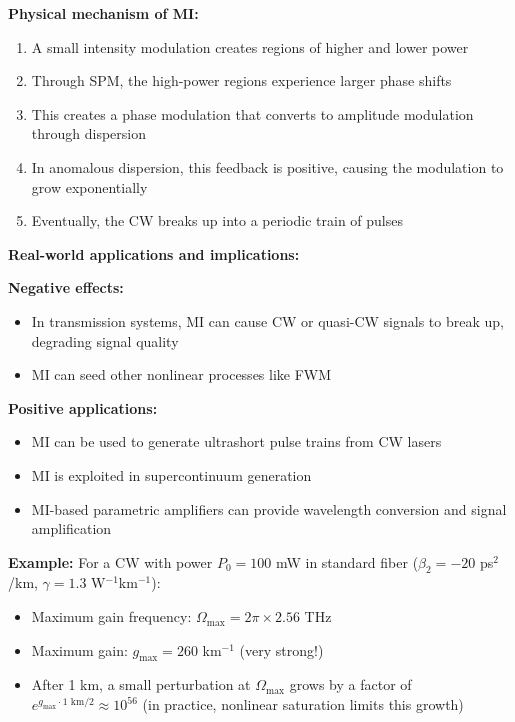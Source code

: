 \documentclass[a4paper, 11pt]{article}
\begin{document}
\begin{physical}
\textbf{Physical mechanism of MI:}

\begin{enumerate}
    \item A small intensity modulation creates regions of higher and lower power
    \item Through SPM, the high-power regions experience larger phase shifts
    \item This creates a phase modulation that converts to amplitude modulation through dispersion
    \item In anomalous dispersion, this feedback is positive, causing the modulation to grow exponentially
    \item Eventually, the CW breaks up into a periodic train of pulses
\end{enumerate}

\textbf{Real-world applications and implications:}

\textbf{Negative effects:}
\begin{itemize}
    \item In transmission systems, MI can cause CW or quasi-CW signals to break up, degrading signal quality
    \item MI can seed other nonlinear processes like FWM
\end{itemize}

\textbf{Positive applications:}
\begin{itemize}
    \item MI can be used to generate ultrashort pulse trains from CW lasers
    \item MI is exploited in supercontinuum generation
    \item MI-based parametric amplifiers can provide wavelength conversion and signal amplification
\end{itemize}

\textbf{Example:} For a CW with power $P_0 = 100$ mW in standard fiber ($\beta_2 = -20$ ps$^2$/km, $\gamma = 1.3$ W$^{-1}$km$^{-1}$):
\begin{itemize}
    \item Maximum gain frequency: $\Omega_{\max} = 2\pi \times 2.56$ THz
    \item Maximum gain: $g_{\max} = 260$ km$^{-1}$ (very strong!)
    \item After 1 km, a small perturbation at $\Omega_{\max}$ grows by a factor of $e^{g_{\max} \cdot 1 \text{ km}/2} \approx 10^{56}$ (in practice, nonlinear saturation limits this growth)
\end{itemize}
\end{physical}
\end{document}
